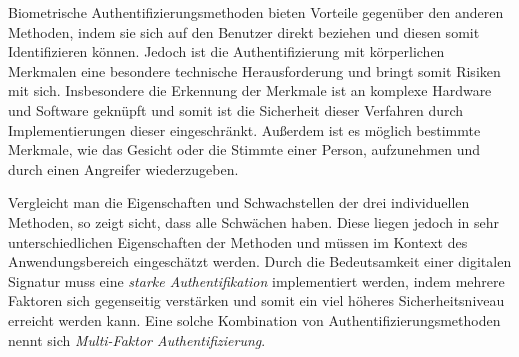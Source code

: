 \documentclass[11pt,a4paper,ngerman]{scrreprt}
\begin{document}
\begin{description}[font=\rmfamily]
    \item[Biometrie:] Biometrische Authentifizierungsmethoden bieten Vorteile gegenüber den anderen Methoden, indem sie sich auf den Benutzer direkt beziehen und diesen somit Identifizieren können. Jedoch ist die Authentifizierung mit körperlichen Merkmalen eine besondere technische Herausforderung und bringt somit Risiken mit sich. Insbesondere die Erkennung der Merkmale ist an komplexe Hardware und Software geknüpft und somit ist die Sicherheit dieser Verfahren durch Implementierungen dieser eingeschränkt. Außerdem ist es möglich bestimmte Merkmale, wie das Gesicht oder die Stimmte einer Person, aufzunehmen und durch einen Angreifer wiederzugeben.
\end{description}
Vergleicht man die Eigenschaften und Schwachstellen der drei individuellen Methoden, so zeigt sicht, dass alle Schwächen haben. Diese liegen jedoch in sehr unterschiedlichen Eigenschaften der Methoden und müssen im Kontext des Anwendungsbereich eingeschätzt werden. Durch die Bedeutsamkeit einer digitalen Signatur muss eine \emph{starke Authentifikation} implementiert werden, indem mehrere Faktoren sich gegenseitig verstärken und somit ein viel höheres Sicherheitsniveau erreicht werden kann. Eine solche Kombination von Authentifizierungsmethoden nennt sich \emph{Multi-Faktor Authentifizierung}.
\end{document}
